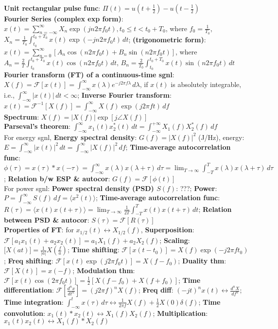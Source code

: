\documentclass[UTF8,a4paper,10pt]{article}
\providecommand{\abs}[1]{\left\lvert#1\right\rvert}
\begin{document}
\begin{multicols}{2}
    \textbf{Unit rectangular pulse func}: $\Pi(t)=u(t+\frac{1}{2})-u(t-\frac{1}{2})$\\
    \textbf{Fourier Series (complex exp form)}: $x(t)=\sum_{n=-\infty}^{\infty}X_n\exp(jn2\pi f_0t),t_0\leq t<t_0+T_0$, where $f_0=\frac{1}{T_0}$, $X_n=\frac{1}{T_0}\int_{t_0}^{t_0+T_0}x(t)\exp(-jn2\pi f_0t)\,dt$; \textbf{(trigonometric form)}: $x(t)=\sum_{n=0}^{\infty}[A_n\cos(n2\pi f_0t)+B_n\sin(n2\pi f_0t)]$, where $A_n=\frac{2}{T}\int_{t_0}^{t_0+T_0}x(t)\cos(n2\pi f_0t)\,dt$, $B_n=\frac{2}{T_0}\int_{t_0}^{t_0+T_0}x(t)\sin(n2\pi f_0t)\,dt$\\
    \textbf{Fourier transform (FT) of a continuous-time sgnl}: $X(f)=\mathscr{F}[x(t)]=\int_{-\infty}^{\infty}x(\lambda)e^{-j2\pi f\lambda}\,d\lambda$, if $x(t)$ is absolutely integrable, i.e., $\int_{-\infty}^{\infty}\abs{x(t)}\,dt<\infty$; \textbf{Inverse Fourier transform}: $x(t)=\mathscr{F}^{-1}[X(f)]=\int_{-\infty}^{\infty}X(f)\exp(j2\pi ft)\,df$\\
    \textbf{Spectrum}: $X(f)=\abs{X(f)}\exp[j\angle X(f)]$\\
    \textbf{Parseval's theorem}: $\int_{-\infty}^{\infty}x_1(t)x_2^*(t)\,dt=\int_{-\infty}^{+\infty}X_1(f)X_2^*(f)\,df$\\
    For energy sgnl, \textbf{Energy spectral density}: $G(f)=\abs{X(f)}^2$ (J/Hz), energy: $E=\int_{-\infty}^{\infty}\abs{x(t)}^2\,dt=\int_{-\infty}^{\infty}\abs{X(f)}^2\,df$; \textbf{Time-average autocorrelation func}: $\phi(\tau)=x(\tau)*x(-\tau)=\int_{-\infty}^{\infty}x(\lambda)x(\lambda+\tau)\,d\tau=\lim_{T\rightarrow\infty}\int_{-T}^Tx(\lambda)x(\lambda+\tau)\,d\tau$; \textbf{Relation b/w ESP \& autocor}: $G(f)=\mathscr{F}[\phi(t)]$\\
    For power sgnl: \textbf{Power spectral density (PSD) $S(f)$}: ???; \textbf{Power}: $P=\int_{-\infty}^{\infty}S(f)\,df=\langle x^2(t)\rangle$; \textbf{Time-average autocorrelation func}: $R(\tau)=\langle x(t)x(t+\tau)\rangle=\lim_{T\rightarrow\infty}\frac{1}{2T}\int_{-T}^Tx(t)x(t+\tau)\,dt$; \textbf{Relation between PSD \& autocor}: $S(\tau)=\mathscr{F}[R(\tau)]$\\
    \textbf{Properties of FT}: for $x_{1/2}(t)\leftrightarrow X_{1/2}(f)$, \textbf{Superposition}: $\mathscr{F}[a_1x_1(t)+a_2x_2(t)]=a_1X_1(f)+a_2X_2(f)$; \textbf{Scaling}: $\mathscr[X(at)]=\frac{1}{\abs{a}}X(\frac{f}{a})$; \textbf{Time shifting}: $\mathscr{F}[x(t-t_0)]=X(f)\exp(-j2\pi ft_0)$; \textbf{Freq shifting}: $\mathscr{F}[x(t)\exp(j2\pi f_0t)]=X(f-f_0)$; \textbf{Duality thm}: $\mathscr{F}[X(t)]=x(-f)$; \textbf{Modulation thm}: $\mathscr{F}[x(t)\cos(2\pi f_0t)]=\frac{1}{2}[X(f-f_0)+X(f+f_0)]$; \textbf{Time differentiation}: $\mathscr{F}[\frac{d^nx}{dt^n}]=(j2\pi f)^nX(f)$; \textbf{Freq diff}: $(-jt)^nx(t)\leftrightarrow\frac{d^nX}{df^n}$; \textbf{Time integration}: $\int_{-\infty}^tx(\tau)\,d\tau\leftrightarrow\frac{1}{2\pi f}X(f)+\frac{1}{2}X(0)\delta(f)$; \textbf{Time convolution}: $x_1(t)*x_2(t)\leftrightarrow X_1(f)X_2(f)$; \textbf{Multiplication}: $x_1(t)x_2(t)\leftrightarrow X_1(f)*X_2(f)$\\

\end{multicols}
\end{document}
